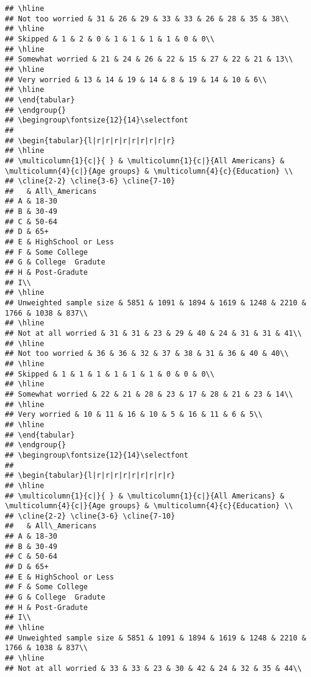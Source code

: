 \documentclass[
]{article}
\begin{document}
\begin{verbatim}
## \hline
## Not too worried & 31 & 26 & 29 & 33 & 33 & 26 & 28 & 35 & 38\\
## \hline
## Skipped & 1 & 2 & 0 & 1 & 1 & 1 & 1 & 0 & 0\\
## \hline
## Somewhat worried & 21 & 24 & 26 & 22 & 15 & 27 & 22 & 21 & 13\\
## \hline
## Very worried & 13 & 14 & 19 & 14 & 8 & 19 & 14 & 10 & 6\\
## \hline
## \end{tabular}
## \endgroup{}
## \begingroup\fontsize{12}{14}\selectfont
## 
## \begin{tabular}{l|r|r|r|r|r|r|r|r|r}
## \hline
## \multicolumn{1}{c|}{ } & \multicolumn{1}{c|}{All Americans} & \multicolumn{4}{c|}{Age groups} & \multicolumn{4}{c}{Education} \\
## \cline{2-2} \cline{3-6} \cline{7-10}
##   & All\_Americans
## A & 18-30
## B & 30-49
## C & 50-64
## D & 65+
## E & HighSchool or Less
## F & Some College
## G & College  Gradute
## H & Post-Gradute
## I\\
## \hline
## Unweighted sample size & 5851 & 1091 & 1894 & 1619 & 1248 & 2210 & 1766 & 1038 & 837\\
## \hline
## Not at all worried & 31 & 31 & 23 & 29 & 40 & 24 & 31 & 31 & 41\\
## \hline
## Not too worried & 36 & 36 & 32 & 37 & 38 & 31 & 36 & 40 & 40\\
## \hline
## Skipped & 1 & 1 & 1 & 1 & 1 & 1 & 0 & 0 & 0\\
## \hline
## Somewhat worried & 22 & 21 & 28 & 23 & 17 & 28 & 21 & 23 & 14\\
## \hline
## Very worried & 10 & 11 & 16 & 10 & 5 & 16 & 11 & 6 & 5\\
## \hline
## \end{tabular}
## \endgroup{}
## \begingroup\fontsize{12}{14}\selectfont
## 
## \begin{tabular}{l|r|r|r|r|r|r|r|r|r}
## \hline
## \multicolumn{1}{c|}{ } & \multicolumn{1}{c|}{All Americans} & \multicolumn{4}{c|}{Age groups} & \multicolumn{4}{c}{Education} \\
## \cline{2-2} \cline{3-6} \cline{7-10}
##   & All\_Americans
## A & 18-30
## B & 30-49
## C & 50-64
## D & 65+
## E & HighSchool or Less
## F & Some College
## G & College  Gradute
## H & Post-Gradute
## I\\
## \hline
## Unweighted sample size & 5851 & 1091 & 1894 & 1619 & 1248 & 2210 & 1766 & 1038 & 837\\
## \hline
## Not at all worried & 33 & 33 & 23 & 30 & 42 & 24 & 32 & 35 & 44\\

\end{verbatim}
\end{document}
